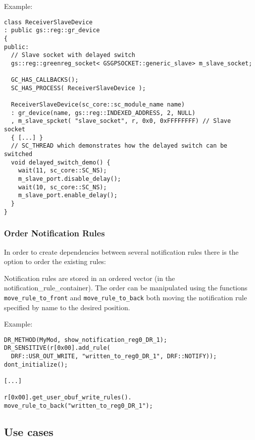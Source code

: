 Example:
\vspace{-1ex}
\begin{lstlisting}
class ReceiverSlaveDevice 
: public gs::reg::gr_device 
{
public:
  // Slave socket with delayed switch
  gs::reg::greenreg_socket< GSGPSOCKET::generic_slave> m_slave_socket;
  
  GC_HAS_CALLBACKS();
  SC_HAS_PROCESS( ReceiverSlaveDevice );
	
  ReceiverSlaveDevice(sc_core::sc_module_name name) 
  : gr_device(name, gs::reg::INDEXED_ADDRESS, 2, NULL)
  , m_slave_spcket( "slave_socket", r, 0x0, 0xFFFFFFFF) // Slave socket
  { [...] }
  // SC_THREAD which demonstrates how the delayed switch can be switched
  void delayed_switch_demo() {
    wait(11, sc_core::SC_NS);
    m_slave_port.disable_delay();
    wait(10, sc_core::SC_NS);
    m_slave_port.enable_delay(); 
  }
}
\end{lstlisting}

\subsubsection{Order Notification Rules}
\label{sec:OrderNotificationRules}

In order to create dependencies between several notification rules there is the option to order the existing rules:

Notification rules are stored in an ordered vector (in the {\sffamily notification\_rule\_container}). The order can be manipulated using the functions \lstinline|move_rule_to_front| and \lstinline|move_rule_to_back| both moving the notification rule specified by name to the desired position.

Example:

\vspace{-1ex}
\noindent
\begin{minipage}{\textwidth}
\begin{lstlisting}
DR_METHOD(MyMod, show_notification_reg0_DR_1);
DR_SENSITIVE(r[0x00].add_rule(
  DRF::USR_OUT_WRITE, "written_to_reg0_DR_1", DRF::NOTIFY));
dont_initialize();

[...]

r[0x00].get_user_obuf_write_rules(). move_rule_to_back("written_to_reg0_DR_1");
\end{lstlisting}
\end{minipage}


\subsection{Use cases}
\label{sec:UseCases}

